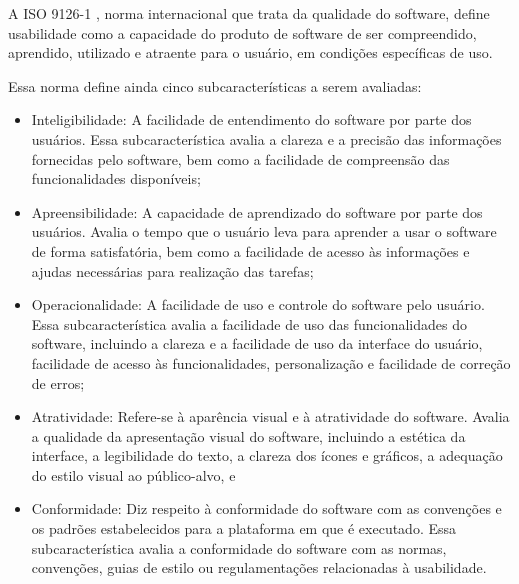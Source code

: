 A ISO 9126-1 \cite{iso9126}, norma internacional que trata da qualidade do software, 
define usabilidade como a capacidade do produto de software de ser compreendido, 
aprendido, utilizado e atraente para o usuário, em condições específicas de uso. 
\begin{description}
    \item Essa norma define ainda cinco subcaracterísticas a serem avaliadas:
          \begin{itemize}
              \item Inteligibilidade: A facilidade de entendimento do software por parte dos usuários. Essa 
              subcaracterística avalia a clareza e a precisão das informações fornecidas pelo software, bem 
              como a facilidade de compreensão das funcionalidades disponíveis;

              \item Apreensibilidade: A capacidade de aprendizado do software por parte dos usuários. Avalia 
              o tempo que o usuário leva para aprender a usar o software de forma satisfatória, bem como a 
                facilidade de acesso às informações e ajudas necessárias para realização das tarefas;

              \item Operacionalidade: A facilidade de uso e controle do software pelo usuário. Essa subcaracterística 
              avalia a facilidade de uso das funcionalidades do software, incluindo a clareza e a facilidade de uso 
              da interface do usuário, facilidade de acesso às funcionalidades, personalização e facilidade de 
              correção de erros;

              \item Atratividade: Refere-se à aparência visual e à atratividade do software. Avalia a qualidade da 
              apresentação visual do software, incluindo a estética da interface, a legibilidade do texto, a clareza 
              dos ícones e gráficos, a adequação do estilo visual ao público-alvo, e

              \item Conformidade: Diz respeito à conformidade do software com as convenções e os padrões estabelecidos para 
              a plataforma em que é executado. Essa subcaracterística avalia a conformidade do software com as normas, 
              convenções, guias de estilo ou regulamentações relacionadas à usabilidade.
          \end{itemize}
\end{description}


